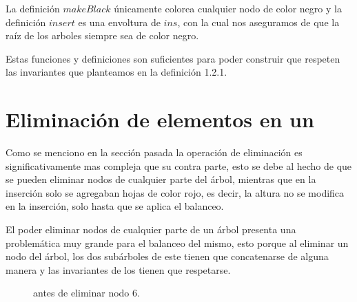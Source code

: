 La definici\'on $makeBlack$ únicamente colorea cualquier nodo de color negro y la definición
$insert$ es una envoltura de $ins$, con la cual nos aseguramos de que la ra\'iz de los arboles
siempre sea de color negro.

Estas funciones y definiciones son suficientes para poder construir {\arns} que respeten las
invariantes que planteamos en la definici\'on 1.2.1.

\section{Eliminación de elementos en un {\arn}}

Como se menciono en la secci\'on pasada la operaci\'on de eliminaci\'on es significativamente mas
compleja que su contra parte, esto se debe al hecho de que se pueden eliminar nodos de cualquier
parte del \'arbol, mientras que en la inserci\'on solo se agregaban hojas de color rojo, es decir,
la altura no se modifica en la inserción\cite{RBTypes}, solo hasta que se aplica el balanceo.

El poder eliminar nodos de cualquier parte de un \'arbol presenta una problemática muy grande para
el balanceo del mismo, esto porque al eliminar un nodo del \'arbol, los dos subárboles de este
tienen que concatenarse de alguna manera y las invariantes de los {\arns} tienen que respetarse.

\begin{figure}
\centering
\captionsetup{justification=centering}
\label{arbolRB}
\caption{{\Arn antes de eliminar nodo 6.}}
\end{figure}

